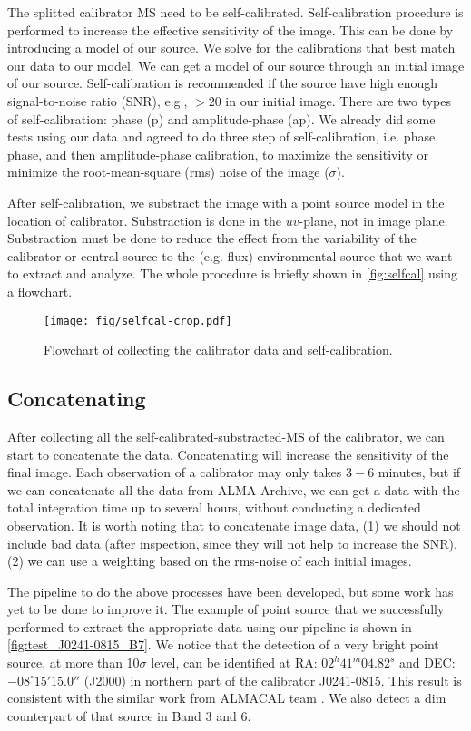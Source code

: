 The splitted calibrator MS need to be self-calibrated. Self-calibration procedure is performed to increase the effective sensitivity 
of the image. This can be done by introducing a model of our source. We solve for the calibrations that best match 
our data to our model. We can get a model of our source through an initial image of our source. Self-calibration is 
recommended if the source have high enough signal-to-noise ratio (SNR), e.g., $> 20$ in our initial image. There are 
two types of self-calibration: phase (p) and amplitude-phase (ap). We already did some tests using our data and agreed 
to do three step of self-calibration, i.e. phase, phase, and then amplitude-phase calibration, to maximize the 
sensitivity or minimize the root-mean-square (rms) noise of the image ($\sigma$).

After self-calibration, we substract the image with a point source model in the location of calibrator. Substraction 
is done in the $uv$-plane, not in image plane. Substraction must be done to reduce the effect from the variability of 
the calibrator or central source to the (e.g. flux) environmental source that we want to extract and analyze. The whole procedure
is briefly shown in \autoref{fig:selfcal} using a flowchart. 

\begin{figure}[ht]
\centering
\texttt{[image: fig/selfcal-crop.pdf]}
\caption{Flowchart of collecting the calibrator data and self-calibration.}
\label{fig:selfcal}
\end{figure}

\subsection{Concatenating}

After collecting all the self-calibrated-substracted-MS of the calibrator, we can start to concatenate the data. 
Concatenating will increase the sensitivity of the final image. Each observation of a calibrator may only takes $3-6$ 
minutes, but if we can concatenate all the data from ALMA Archive, we can get a data with the total integration 
time up to several hours, without conducting a dedicated observation. It is worth noting that to concatenate image data, 
(1) we should not include bad data (after inspection, since they will not help to increase the SNR), 
(2) we can use a weighting based on the rms-noise of each initial images.

The pipeline to do the above processes have been developed, but some work has yet to be done to improve it. 
The example of point source that we 
successfully performed to extract the appropriate data using our pipeline is 
shown in \autoref{fig:test_J0241-0815_B7}. We notice that the detection of a very bright point 
source, at more than 10$\sigma$ level, can be identified at RA: $02^{h}41^{m}04.82^{s}$ and DEC: $-08^{\circ}15'15.0''$ (J2000) 
in northern part of the 
calibrator J0241-0815. This result is consistent with the similar work from ALMACAL team \citep{almacal1_2016}. 
We also detect a dim counterpart of that source in Band 3 and 6.

